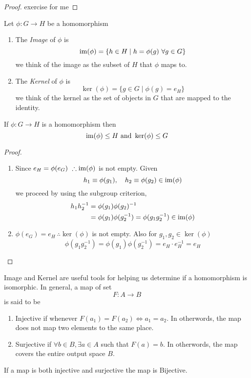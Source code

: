 \documentclass{article}
\begin{document}
\begin{proof}
    exercise for me
\end{proof}

\begin{defi}
    Let $\phi : G \rightarrow H$ be a homomorphism
    \begin{enumerate}
        \item The \emph{Image} of $\phi$ is
        \[
            \im(\phi) = \{h \in H \mid h = \phi(g) \ \forall g \in G\}
        \]
        we think of the image as the subset of $H$ that $\phi$ maps to.
        \item The \emph{Kernel} of $\phi$ is
        \[
            \ker(\phi) = \{g \in G \mid \phi(g) = e_H\}
        \]
        we think of the kernel as the set of objects in $G$ that are mapped to the identity.
    \end{enumerate}
\end{defi}

\begin{prop}
    If $\phi : G \rightarrow H$ is a homomorphism then
    \[
        \im(\phi) \leq H \ \text{and} \ \ker(\phi) \leq G
    \]
\end{prop}

\begin{proof}\leavevmode
    \begin{enumerate}
        \item Since $e_H = \phi(e_G) \ \therefore \operatorname{im}(\phi)$ is not empty. Given
        \[
            h_1 \equiv \phi(g_1), \quad h_2 \equiv \phi(g_2) \in \operatorname{im}(\phi)
        \]
        we proceed by using the subgroup criterion, 
        \begin{align*}
            h_1h_2^{-1} &= \phi(g_1)\phi(g_2)^{-1} \\
            &= \phi(g_1)\phi(g_2^{-1}) = \phi(g_1g_2^{-1}) \in \operatorname{im}(\phi)
        \end{align*}
        
        \item $\phi(e_G) = e_H \ \therefore \ker(\phi)$ is not empty. Also for $g_1, g_2 \in \ker(\phi)$
        \[
            \phi(g_1 g_2^{-1}) =  \phi(g_1) \phi(g_2^{-1})= e_H \cdot e_H^{-1} = e_H
        \]
    \end{enumerate}
\end{proof}

\begin{remark}
    Image and Kernel are useful tools for helping us determine if a homomorphism is isomorphic. In general, a map of set
    \[
        F : A \rightarrow B  
    \]
    is said to be
    \begin{enumerate}
        \item Injective if whenever $F(a_1) = F(a_2) \Leftrightarrow a_1 = a_2$. In otherwords, the map does not map two elements to the same place.
        \item Surjective if $\forall b \in B, \exists a \in A$ such that $F(a) = b$. In otherwords, the map covers the entire output space $B$.
    \end{enumerate}
    If a map is both injective and surjective the map is Bijective.
\end{remark}
\end{document}
